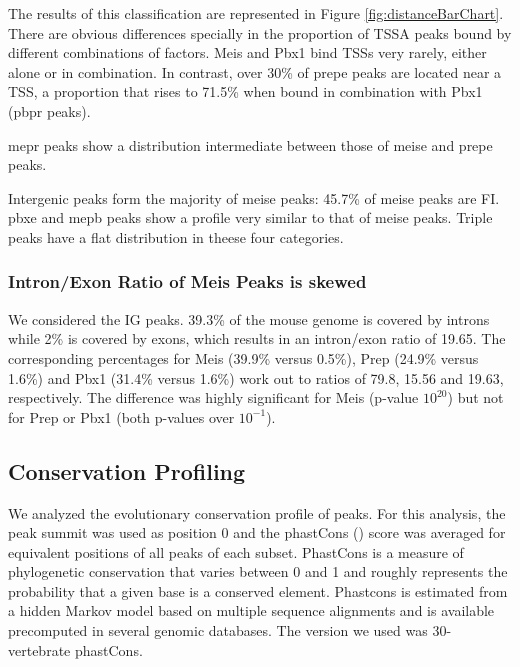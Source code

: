 The results of this classification are represented in Figure \ref{fig:distanceBarChart}. There are obvious differences specially in the proportion of \ac{TSSA} peaks bound by different combinations of factors. Meis and Pbx1 bind \acp{TSS} very rarely, either alone or in combination. In contrast, over 30\% of \ac{prepe} peaks are located near a \ac{TSS}, a proportion that rises to 71.5\% when bound in combination with Pbx1 (\ac{pbpr} peaks). 

\ac{mepr} peaks show a distribution intermediate between those of \ac{meise} and \ac{prepe} peaks.

Intergenic peaks form the majority of \ac{meise} peaks: 45.7\% of \ac{meise} peaks are \ac{FI}. \ac{pbxe} and \ac{mepb} peaks show a profile very similar to that of \ac{meise} peaks. Triple peaks have a flat distribution in theese four categories.
\subsubsection{Intron/Exon Ratio of Meis Peaks is skewed}

We considered the \ac{IG} peaks. 39.3\% of the mouse genome is covered by introns while 2\% is covered by exons, which results in an intron/exon ratio of 19.65. The corresponding percentages for Meis (39.9\% versus 0.5\%), Prep (24.9\% versus 1.6\%) and Pbx1 (31.4\% versus 1.6\%) work out to ratios of 79.8, 15.56 and 19.63, respectively. The difference was highly significant for Meis (p-value \< $10^20$) but not for Prep or Pbx1 (both p-values over $10^{-1}$). 

\subsection{Conservation Profiling}

We analyzed the evolutionary conservation profile of peaks. For this analysis, the peak summit was used as position 0 and the phastCons (\cite{Siepel2005}) score was averaged for equivalent positions of all peaks of each subset. PhastCons is a measure of phylogenetic conservation that varies between 0 and 1 and roughly represents the probability that a given base is a conserved element. Phastcons is estimated from a hidden Markov model based on multiple sequence alignments and is available precomputed in several genomic databases. The version we used was 30-vertebrate phastCons.


